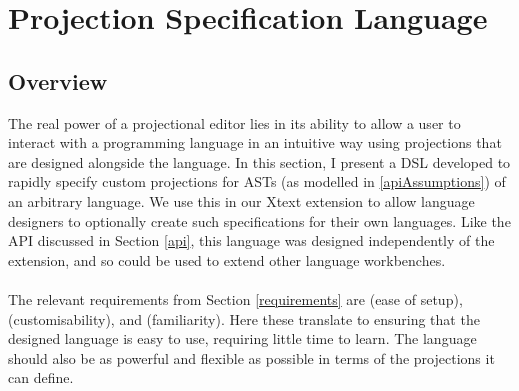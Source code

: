 \documentclass{article}
\begin{document}
{%

\section{Projection Specification Language}\label{EditorLanguage}
\subsection{Overview}
The real power of a projectional editor lies in its ability to allow a user to interact with a programming language in an intuitive way using projections that are designed alongside the language. In this section, I present a DSL developed to rapidly specify custom projections for ASTs (as modelled in \ref{apiAssumptions}) of an arbitrary language. We use this in our Xtext extension to allow language designers to optionally create such specifications for their own languages. Like the API discussed in Section \ref{api}, this language was designed independently of the extension, and so could be used to extend other language workbenches.
\\
\\
The relevant requirements from Section \ref{requirements} are \RSetup (ease of setup), \RCustom (customisability), and \RFamiliarity (familiarity). Here these translate to ensuring that the designed language is easy to use, requiring little time to learn. The language should also be as powerful and flexible as possible in terms of the projections it can define.

}
\end{document}
